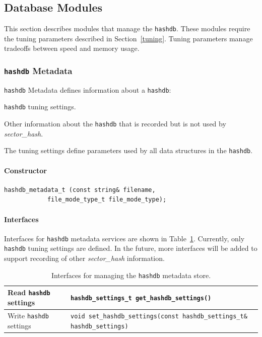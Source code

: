 \documentclass[10pt,twoside]{article}
\newcommand{\sh}{\emph{sector\_hash}\xspace}
\newcommand{\hdb}{\texttt{hashdb}\xspace}
\begin{document}
\subsection{Database Modules}
This section describes modules that manage the \hdb.
These modules require the tuning parameters described in Section~\ref{tuning}.
Tuning parameters manage tradeoffs between speed and memory usage.

\subsubsection{\hdb Metadata}
\hdb Metadata defines information about a \hdb:
\begin{compactitem}
\item \hdb tuning settings.
\item Other information about the \hdb that is recorded but is not used by \sh.
\end{compactitem}
The tuning settings define parameters used by all data structures in the \hdb.
\paragraph{Constructor}
\begin{small}
\begin{verbatim}
hashdb_metadata_t (const string& filename,
            file_mode_type_t file_mode_type);
\end{verbatim}
\end{small}

\paragraph{Interfaces}
Interfaces for \hdb metadata services
are shown in Table~\ref{hashdb-metadata-interfaces}.
Currently, only \hdb tuning settings are defined.
In the future, more interfaces will be added to support recording of other \sh information.
\begin{table}[h]
\center
\begin{tabular}{|p{2in}|p{4in}|}
\hline
Read \hdb settings & \texttt{hashdb\_settings\_t get\_hashdb\_settings()} \\
\hline
Write \hdb settings & \texttt{void set\_hashdb\_settings(const hashdb\_settings\_t\& hashdb\_settings)} \\
\hline
\end{tabular}
\caption{Interfaces for managing the \hdb metadata store.\label{hashdb-metadata-interfaces}}
\end{table}
\end{document}
